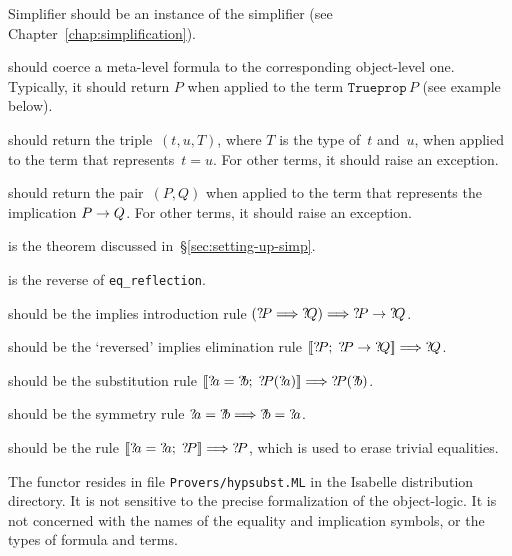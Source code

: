 \begin{ttdescription}
\item[Simplifier] should be an instance of the simplifier (see
  Chapter~\ref{chap:simplification}).
  
\item[\ttindexbold{dest_Trueprop}] should coerce a meta-level formula to the
  corresponding object-level one.  Typically, it should return $P$ when
  applied to the term $\texttt{Trueprop}\,P$ (see example below).
  
\item[\ttindexbold{dest_eq}] should return the triple~$(t,u,T)$, where $T$ is
  the type of~$t$ and~$u$, when applied to the \ML{} term that
  represents~$t=u$.  For other terms, it should raise an exception.
  
\item[\ttindexbold{dest_imp}] should return the pair~$(P,Q)$ when applied to
  the \ML{} term that represents the implication $P\rightarrow Q$.  For other terms,
  it should raise an exception.

\item[\tdxbold{eq_reflection}] is the theorem discussed
  in~\S\ref{sec:setting-up-simp}.
  
\item[\tdxbold{rev_eq_reflection}] is the reverse of \texttt{eq_reflection}.

\item[\tdxbold{imp_intr}] should be the implies introduction
rule $({?\!P}\Longrightarrow{?\!Q})\Longrightarrow {?\!P}\rightarrow{?\!Q}$.

\item[\tdxbold{rev_mp}] should be the `reversed' implies elimination
rule $\mathopen{[\![}{?\!P};  \;{?\!P}\rightarrow{?\!Q}\mathclose{]\!]} \Longrightarrow {?\!Q}$.

\item[\tdxbold{subst}] should be the substitution rule
$\List{\Var{a}=\Var{b};\; \Var{P}(\Var{a})} \Imp \Var{P}(\Var{b})$.

\item[\tdxbold{sym}] should be the symmetry rule
${?\!a}={?\!b}\Longrightarrow{?\!b}={?\!a}$.

\item[\tdxbold{thin_refl}] should be the rule
$\mathopen{[\![}{?\!a}={?\!a};\; {?\!P}\mathclose{]\!]} \Longrightarrow {?\!P}$, which is used to erase
trivial equalities.
\end{ttdescription}
%
The functor resides in file \texttt{Provers/hypsubst.ML} in the Isabelle
distribution directory.  It is not sensitive to the precise formalization
of the object-logic.  It is not concerned with the names of the equality
and implication symbols, or the types of formula and terms.  


